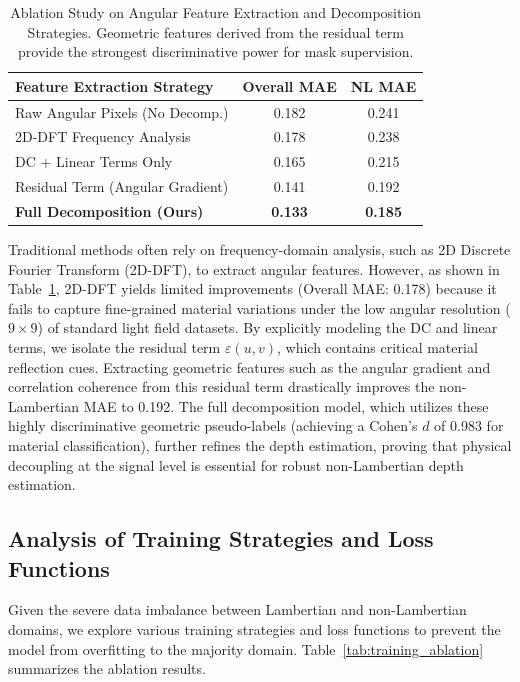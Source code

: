 \begin{table}[!t]
\centering
\caption{Ablation Study on Angular Feature Extraction and Decomposition Strategies. Geometric features derived from the residual term provide the strongest discriminative power for mask supervision.}
\label{tab:feature_ablation}
\begin{tabular}{lcc}
\toprule
\textbf{Feature Extraction Strategy} & \textbf{Overall MAE} & \textbf{NL MAE} \\
\midrule
Raw Angular Pixels (No Decomp.) & 0.182 & 0.241 \\
2D-DFT Frequency Analysis & 0.178 & 0.238 \\
DC + Linear Terms Only & 0.165 & 0.215 \\
Residual Term (Angular Gradient) & 0.141 & 0.192 \\
\textbf{Full Decomposition (Ours)} & \textbf{0.133} & \textbf{0.185} \\
\bottomrule
\end{tabular}
\end{table}

Traditional methods often rely on frequency-domain analysis, such as 2D Discrete Fourier Transform (2D-DFT), to extract angular features. However, as shown in Table~\ref{tab:feature_ablation}, 2D-DFT yields limited improvements (Overall MAE: 0.178) because it fails to capture fine-grained material variations under the low angular resolution ($9 \times 9$) of standard light field datasets. By explicitly modeling the DC and linear terms, we isolate the residual term $\varepsilon(u,v)$, which contains critical material reflection cues. Extracting geometric features such as the angular gradient and correlation coherence from this residual term drastically improves the non-Lambertian MAE to 0.192. The full decomposition model, which utilizes these highly discriminative geometric pseudo-labels (achieving a Cohen's $d$ of 0.983 for material classification), further refines the depth estimation, proving that physical decoupling at the signal level is essential for robust non-Lambertian depth estimation.

\subsection{Analysis of Training Strategies and Loss Functions}

Given the severe data imbalance between Lambertian and non-Lambertian domains, we explore various training strategies and loss functions to prevent the model from overfitting to the majority domain. Table~\ref{tab:training_ablation} summarizes the ablation results.

